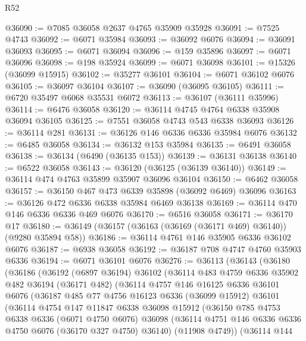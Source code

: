 \begin{lexlean}{R52}
\begin{coremodule}
@36090 := @7085 @36058 @2637 @4765 @35909 @35928
@36091 := @7525 @4743
@36092 := @6071 @35984
@36093 := @36092 @6076
@36094 := @36091 @36093
@36095 := @6071 @36094
@36096 := @159 @35896
@36097 := @6071 @36096
@36098 := @198 @35924
@36099 := @6071 @36098
@36101 := @15326 (@36099 @15915)
@36102 := @35277 @36101
@36104 := @6071 @36102 @6076
@36105 := @36097 @36104
@36107 := @36090 (@36095 @36105)
@36111 := @6720 @35497 @6068 @35531 @6072
@36113 := @36107 (@36111 @35996)
@36114 := @6476 @36058
@36120 := @36114 @4745 @4764 @6338 @35908 @36094 @36105
@36125 := @7551 @36058 @4743 @543 @6338 @36093
@36126 := @36114 @281
@36131 := @36126 @146 @6336 @6336 @35984 @6076
@36132 := @6485 @36058
@36134 := @36132 @153 @35984
@36135 := @6491 @36058
@36138 := @36134 (@6490 (@36135 @153))
@36139 := @36131 @36138
@36140 := @6522 @36058
@36143 := @36120 (@36125 (@36139 @36140))
@36149 := @36114 @474 @4763 @35899 @35907 @36096 @36104
@36150 := @6462 @36058
@36157 := @36150 @467 @473 @6339 @35898 (@36092 @6469) @36096
@36163 := @36126 @472 @6336 @6338 @35984 @6469 @36138
@36169 := @36114 @470 @146 @6336 @6336 @469 @6076
@36170 := @6516 @36058
@36171 := @36170 @17
@36180 := @36149 (@36157 (@36163 (@36169 (@36171 @469) @36140)) (@9280 @35894 @58))
@36186 := @36114 @4761 @146 @35905 @6336 @36102 @6076
@36187 := @6938 @36058
@36192 := @36187 @708 @4747 @4760 @35903 @6336
@36194 := @6071 @36101 @6076
@36276 := @36113
    (@36143
      (@36180
        (@36186
          (@36192
            (@6897 @36194)
            @36102
            (@36114
              @483
              @4759
              @6336
              @35902
              @482
              @36194
              (@36171 @482)
              (@36114
                @4757
                @146
                @16125
                @6336
                @36101
                @6076
                (@36187
                  @485
                  @77
                  @4756
                  @16123
                  @6336
                  (@36099 @15912)
                  @36101
                  (@36114
                    @4754
                    @147
                    @11847
                    @6338
                    @36098
                    @15912
                    (@36150
                      @785
                      @4753
                      @6338
                      @6336
                      (@6071 @4750 @6076)
                      @36098
                      (@36114 @4751 @146 @6336 @6336 @4750 @6076 (@36170 @327 @4750) @36140)
                      (@11908 @4749))
                    (@36114
                      @144

\end{coremodule}
\end{lexlean}
